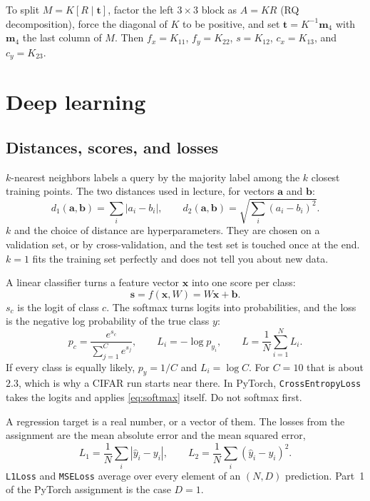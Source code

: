 \documentclass[11pt]{article}
\begin{document}
To split $M=K[R\mid\mathbf{t}]$, factor the left $3\times 3$ block as $A=KR$ (RQ decomposition), force the diagonal of $K$ to be positive, and set $\mathbf{t}=K^{-1}\mathbf{m}_4$ with $\mathbf{m}_4$ the last column of $M$. Then $f_x=K_{11}$, $f_y=K_{22}$, $s=K_{12}$, $c_x=K_{13}$, and $c_y=K_{23}$.

\section{Deep learning}

\subsection{Distances, scores, and losses}

$k$-nearest neighbors labels a query by the majority label among the $k$ closest training points. The two distances used in lecture, for vectors $\mathbf{a}$ and $\mathbf{b}$:
\begin{equation}
d_1(\mathbf{a},\mathbf{b})=\sum_i |a_i-b_i|,
\qquad
d_2(\mathbf{a},\mathbf{b})=\sqrt{\sum_i (a_i-b_i)^2}.
\end{equation}
$k$ and the choice of distance are hyperparameters. They are chosen on a validation set, or by cross-validation, and the test set is touched once at the end. $k=1$ fits the training set perfectly and does not tell you about new data.

A linear classifier turns a feature vector $\mathbf{x}$ into one score per class:
\begin{equation}
\mathbf{s}=f(\mathbf{x},W)=W\mathbf{x}+\mathbf{b}.
\end{equation}
$s_c$ is the logit of class $c$. The softmax turns logits into probabilities, and the loss is the negative log probability of the true class $y$:
\begin{equation}
p_c=\frac{e^{s_c}}{\sum_{j=1}^{C} e^{s_j}},
\qquad
L_i=-\log p_{y_i},
\qquad
L=\frac{1}{N}\sum_{i=1}^{N} L_i.
\label{eq:softmax}
\end{equation}
If every class is equally likely, $p_y=1/C$ and $L_i=\log C$. For $C=10$ that is about $2.3$, which is why a CIFAR run starts near there. In PyTorch, \texttt{CrossEntropyLoss} takes the logits and applies \eqref{eq:softmax} itself. Do not softmax first.

A regression target is a real number, or a vector of them. The losses from the assignment are the mean absolute error and the mean squared error,
\begin{equation}
L_1=\frac{1}{N}\sum_i |\hat y_i-y_i|,
\qquad
L_2=\frac{1}{N}\sum_i (\hat y_i-y_i)^2.
\end{equation}
\texttt{L1Loss} and \texttt{MSELoss} average over every element of an $(N,D)$ prediction. Part~1 of the PyTorch assignment is the case $D=1$.
\end{document}
